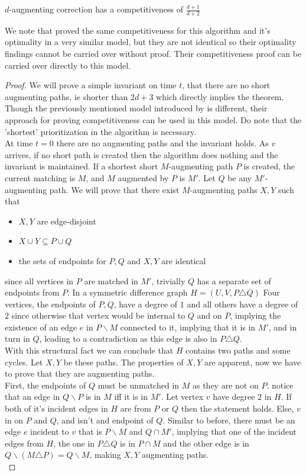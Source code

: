 \begin{theorem}
	$d$-augmenting correction has a competitiveness of $\frac{d+1}{d+2}$
\end{theorem}

We note that \cite{obmCorrections} proved the same competitiveness for this algorithm and it's optimality in a very similar model, but they are not identical so their optimality findings cannot be carried over without proof. Their competitiveness proof can be carried over directly to this model.

\begin{proof}
	We will prove a simple invariant on time $t$, that there are no short augmenting paths, ie shorter than $2d+3$ which directly implies the theorem. Though the previously mentioned model introduced by \cite{obmCorrections} is different, their approach for proving competitiveness can be used in this model. Do note that the 'shortest' prioritization in the algorithm is necessary.\\
	At time $t=0$ there are no augmenting paths and the invariant holds.
	As $v$ arrives, if no short path is created then the algorithm does nothing and the invariant is maintained. If a shortest short $M$-augmenting path $P$ is created, the current matching is $M$, and $M$ augmented by $P$ is $M'$. Let $Q$ be any $M'$-augmenting path. We will prove that there exist $M$-augmenting paths $X,Y$ such that
	\begin{itemize}
		\item $X,Y$ are edge-disjoint
		\item $X\cup Y\subseteq P\cup Q$
		\item the sets of endpoints for $P,Q$ and $X,Y$ are identical
	\end{itemize}
	since all vertices in $P$ are matched in $M'$, trivially $Q$ has a separate set of endpoints from $P$. In a symmetric difference graph $H=(U,V,P\triangle Q)$ Four vertices, the endpoints of $P,Q$, have a degree of $1$ and all others have a degree of $2$ since otherwise that vertex would be internal to $Q$ and on $P$, implying the existence of an edge $e$ in $P\backslash M$ connected to it, implying that it is in $M'$, and in turn in $Q$, leading to a contradiction as this edge is also in $P\triangle Q$.\\
	With this structural fact we can conclude that $H$ contains two paths and some cycles. Let $X,Y$ be these paths. The properties of $X,Y$ are apparent, now we have to prove that they are augmenting paths.\\
	First, the endpoints of $Q$ must be unmatched in $M$ as they are not on $P$. notice that an edge in $Q\backslash P$ is in $M$ iff it is in $M'$. Let vertex $v$ have degree $2$ in $H$. If both of it's incident edges in $H$ are from $P$ or $Q$ then the statement holds. Else, $v$ in on $P$ and $Q$, and isn't and endpoint of $Q$. Similar to before, there must be an edge $e$ incident to $v$ that is $P\backslash M$ and $Q\cap M'$, implying that one of the incident edges from $H$, the one in $P\triangle Q$ is in $P\cap M$ and the other edge is in $Q\backslash(M\triangle P)=Q\backslash M$, making $X,Y$ augmenting paths.\\
	

\end{proof}
